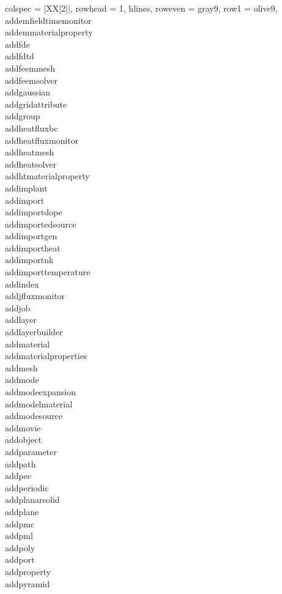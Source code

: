 \begin{longtblr}[
  caption = {Long Title},
  label = {tab:commands},
]{
  colspec = {|XX[2]|},
  rowhead = 1,
  hlines,
  row{even} = {gray9},
  row{1} = {olive9},
}
addemfieldtimemonitor\\
addemmaterialproperty\\
addfde\\
addfdtd\\
addfeemmesh\\
addfeemsolver\\
addgaussian\\
addgridattribute\\
addgroup\\
addheatfluxbc\\
addheatfluxmonitor\\
addheatmesh\\
addheatsolver\\
addhtmaterialproperty\\
addimplant\\
addimport\\
addimportdope\\
addimportedsource\\
addimportgen\\
addimportheat\\
addimportnk\\
addimporttemperature\\
addindex\\
addjfluxmonitor\\
addjob\\
addlayer\\
addlayerbuilder\\
addmaterial\\
addmaterialproperties\\
addmesh\\
addmode\\
addmodeexpansion\\
addmodelmaterial\\
addmodesource\\
addmovie\\
addobject\\
addparameter\\
addpath\\
addpec\\
addperiodic\\
addplanarsolid\\
addplane\\
addpmc\\
addpml\\
addpoly\\
addport\\
addproperty\\
addpyramid\\

\end{longtblr}
